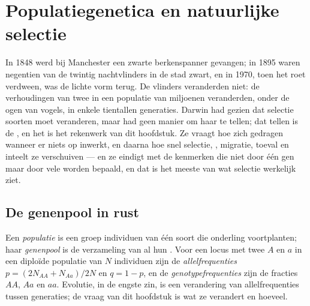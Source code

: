 \chapter{Populatiegenetica en natuurlijke selectie}\label{ch:b2:population-genetics}

In 1848 werd bij Manchester een zwarte berkenspanner gevangen; in 1895 waren
negentien van de twintig nachtvlinders in de stad zwart, en in 1970, toen het
roet verdween, was de lichte vorm terug. De vlinders veranderden niet: de
verhoudingen van twee  in een populatie van miljoenen veranderden,
onder de ogen van vogels, in enkele tientallen generaties. Darwin had gezien
dat selectie soorten moet veranderen, maar had geen manier om haar te tellen;
dat tellen is de , en het is het rekenwerk van dit hoofdstuk.
Ze vraagt hoe  zich gedragen wanneer er niets op inwerkt, en
daarna hoe snel selectie, , migratie, toeval en inteelt ze verschuiven
--- en ze eindigt met de kenmerken die niet door één gen maar door vele worden
bepaald, en dat is het meeste van wat selectie werkelijk ziet.

\section{De genenpool in rust}

\begin{definition}\label{def:b2:population-genetics:frequencies}
Een \emph{populatie} is een groep individuen van één soort die onderling
voortplanten; haar \emph{genenpool} is de verzameling van al hun .
Voor een locus met twee  $A$ en $a$ in een diploïde populatie van
$N$ individuen zijn de \emph{allelfrequenties} $p = (2N_{AA} +
N_{Aa})/2N$ en $q = 1 - p$, en de \emph{genotypefrequenties} zijn
de fracties $AA$, $Aa$ en $aa$. Evolutie, in de engste zin, is een
verandering van allelfrequenties tussen generaties; de vraag van dit hoofdstuk
is wat ze verandert en hoeveel.
\end{definition}

